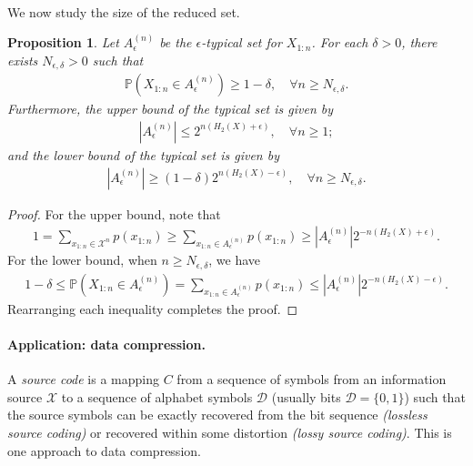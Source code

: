 \documentclass{article}
\numberwithin{equation}{section}
\newcommand{\bbP}{\mathbb{P}}
\renewcommand{\cal}{\mathcal}
\theoremstyle{plain}
\newtheorem{proposition}[theorem]{Proposition}
\theoremstyle{definition}
\begin{document}
\paragraph{} We now study the size of the reduced set.
\begin{proposition}
Let $A^{(n)}_\epsilon$ be the $\epsilon$-typical set for $X_{1:n}$. For each $\delta>0$, there exists $N_{\epsilon,\delta}>0$ such that
\begin{align*}
	\bbP\left(X_{1:n}\in A_\epsilon^{(n)}\right)\geq 1-\delta,\quad \forall n\geq N_{\epsilon,\delta}.
\end{align*}
Furthermore, the upper bound of the typical set is given by
\begin{align*}
	\left\vert A_\epsilon^{(n)}\right\vert\leq 2^{n(H_2(X)+\epsilon)},\quad\forall n\geq 1;
\end{align*}
and the lower bound of the typical set is given by
\begin{align*}
	\left\vert A_\epsilon^{(n)}\right\vert\geq (1-\delta)2^{n(H_2(X)-\epsilon)},\quad\forall n\geq N_{\epsilon,\delta}.
\end{align*}
\end{proposition}
\begin{proof}
For the upper bound, note that
\begin{align*}
	1=\sum_{x_{1:n}\in\cal{X}^n}p(x_{1:n})\geq \sum_{x_{1:n}\in A_\epsilon^{(n)}}p(x_{1:n})\geq\left\vert A_\epsilon^{(n)}\right\vert 2^{-n(H_2(X)+\epsilon)}.
\end{align*}
For the lower bound, when $n\geq N_{\epsilon,\delta}$, we have
\begin{align*}
	1-\delta\leq\bbP\left(X_{1:n}\in A_\epsilon^{(n)}\right)= \sum_{x_{1:n}\in A_\epsilon^{(n)}}p(x_{1:n})\leq\left\vert A_\epsilon^{(n)}\right\vert 2^{-n(H_2(X)-\epsilon)}.
\end{align*}
Rearranging each inequality completes the proof.
\end{proof}
\paragraph{Application: data compression.} A \textit{source code} is a mapping $C$ from a sequence of symbols from an information source $\cal{X}$ to a sequence of alphabet symbols $\cal{D}$ (usually bits $\cal{D}=\{0,1\}$) such that the source symbols can be exactly recovered from the bit sequence \textit{(lossless source coding)} or recovered within some distortion \textit{(lossy source coding)}. This is one approach to data compression.
\end{document}
